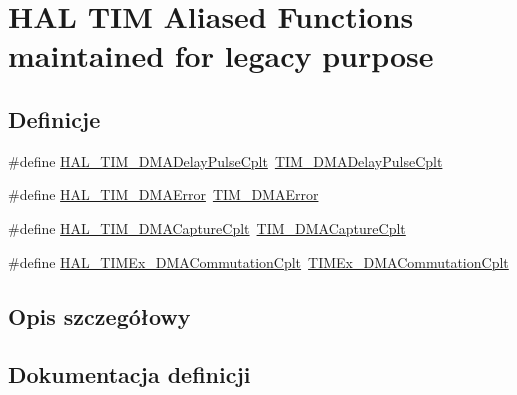 \hypertarget{group___h_a_l___t_i_m___aliased___functions}{}\section{H\+AL T\+IM Aliased Functions maintained for legacy purpose}
\label{group___h_a_l___t_i_m___aliased___functions}
\subsection*{Definicje}
\begin{DoxyCompactItemize}
\item 
\#define \hyperlink{group___h_a_l___t_i_m___aliased___functions_gae99a6d39371e47fdec833e26fc1b8884}{H\+A\+L\+\_\+\+T\+I\+M\+\_\+\+D\+M\+A\+Delay\+Pulse\+Cplt}~\hyperlink{group___t_i_m___private___functions_ga78edd2f05a873d68690d8658aa427ccf}{T\+I\+M\+\_\+\+D\+M\+A\+Delay\+Pulse\+Cplt}
\item 
\#define \hyperlink{group___h_a_l___t_i_m___aliased___functions_ga14152e5dd8e2448adf9d9345c5d14caf}{H\+A\+L\+\_\+\+T\+I\+M\+\_\+\+D\+M\+A\+Error}~\hyperlink{group___t_i_m___private___functions_gaa112bee5279feee040c1ea9e283f7378}{T\+I\+M\+\_\+\+D\+M\+A\+Error}
\item 
\#define \hyperlink{group___h_a_l___t_i_m___aliased___functions_ga190d337ac7a89138c13d5c0143b7ef50}{H\+A\+L\+\_\+\+T\+I\+M\+\_\+\+D\+M\+A\+Capture\+Cplt}~\hyperlink{group___t_i_m___private___functions_ga60b9c315720fddb3db32299f05f7d712}{T\+I\+M\+\_\+\+D\+M\+A\+Capture\+Cplt}
\item 
\#define \hyperlink{group___h_a_l___t_i_m___aliased___functions_gae7cdfde33882b4927f1ed33774103419}{H\+A\+L\+\_\+\+T\+I\+M\+Ex\+\_\+\+D\+M\+A\+Commutation\+Cplt}~\hyperlink{group___t_i_m_ex___private___functions_gaf473fa38254d62a74a006a781fe0aeb8}{T\+I\+M\+Ex\+\_\+\+D\+M\+A\+Commutation\+Cplt}
\end{DoxyCompactItemize}


\subsection{Opis szczegółowy}


\subsection{Dokumentacja definicji}
\mbox{\label{group___h_a_l___t_i_m___aliased___functions_ga190d337ac7a89138c13d5c0143b7ef50}} 
